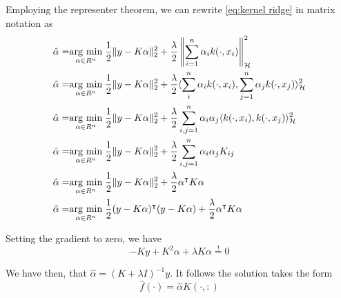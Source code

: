 Employing the representer theorem, we can rewrite \ref{eq:kernel ridge} in matrix notation as
\begin{equation}
    \begin{aligned}
    \hat{\alpha}=&\underset{\alpha \in R^n}{\operatorname{arg}\,\operatorname{min}}\;\frac{1}{2}\|y-K\alpha\|_2^2+\frac{\lambda}{2}\left\|\sum _{i=1}^{n}\alpha _{i}k(\cdot ,x_{i})\right\|_{\mathcal{H}}^2
    \\
    \hat{\alpha}=&\underset{\alpha \in R^n}{\operatorname{arg}\,\operatorname{min}}\;\frac{1}{2}\|y-K\alpha\|_2^2+\frac{\lambda}{2} \langle \sum _{i}^{n}\alpha _{i}k(\cdot ,x_{i}),\sum _{j=1}^{n}\alpha _{j}k(\cdot ,x_{j})\rangle_{\mathcal{H}}^2
    \\
    \hat{\alpha}=&\underset{\alpha \in R^n}{\operatorname{arg}\,\operatorname{min}}\;\frac{1}{2}\|y-K\alpha\|_2^2+\frac{\lambda}{2} \sum _{i,j=1}^{n}\alpha _{i}\alpha _{j}\langle k(\cdot ,x_{i}),k(\cdot ,x_{j})\rangle_{\mathcal{H}}^2
    \\
    \hat{\alpha}=&\underset{\alpha \in R^n}{\operatorname{arg}\,\operatorname{min}}\;\frac{1}{2}\|y-K\alpha\|_2^2+\frac{\lambda}{2} \sum _{i,j=1}^{n}\alpha _{i}\alpha _{j}K_{ij}
    \\
    \hat{\alpha}=&\underset{\alpha \in R^n}{\operatorname{arg}\,\operatorname{min}}\;\frac{1}{2}\|y-K\alpha\|_2^2+\frac{\lambda}{2} \alpha^\intercal K \alpha
    \\
    \hat{\alpha}=&\underset{\alpha \in R^n}{\operatorname{arg}\,\operatorname{min}}\;\frac{1}{2}(y-K\alpha)^\intercal (y-K\alpha)+\frac{\lambda}{2} \alpha^\intercal K \alpha
\end{aligned}
\end{equation}

Setting the gradient to zero, we have
\begin{equation}
    -Ky+K^2\alpha+\lambda K \alpha\overset{!}{=}0
\end{equation}

We have then, that $\hat{\alpha}=(K+\lambda I)^{-1}y$. It follows the solution takes the form
\begin{equation}
    \hat{f}(\cdot)=\hat{\alpha}K(\cdot,:)
\end{equation}

